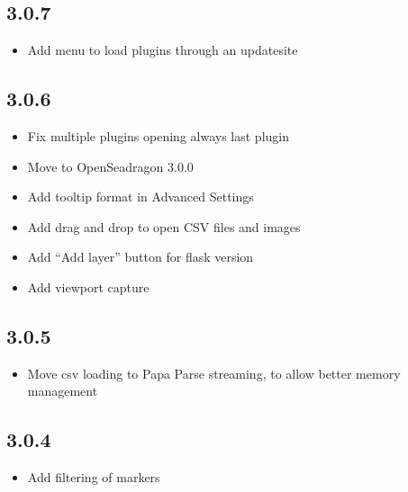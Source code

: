 \documentclass[letterpaper,10pt,english,openany,oneside]{sphinxmanual}
\begin{document}
\subsection{3.0.7}
\label{\detokenize{docs/intro/versions:id7}}\begin{itemize}
\item {} 
\sphinxAtStartPar
Add menu to load plugins through an update\sphinxhyphen{}site

\end{itemize}


\subsection{3.0.6}
\label{\detokenize{docs/intro/versions:id8}}\begin{itemize}
\item {} 
\sphinxAtStartPar
Fix multiple plugins opening always last plugin

\item {} 
\sphinxAtStartPar
Move to OpenSeadragon 3.0.0

\item {} 
\sphinxAtStartPar
Add tooltip format in Advanced Settings

\item {} 
\sphinxAtStartPar
Add drag and drop to open CSV files and images

\item {} 
\sphinxAtStartPar
Add “Add layer” button for flask version

\item {} 
\sphinxAtStartPar
Add viewport capture

\end{itemize}


\subsection{3.0.5}
\label{\detokenize{docs/intro/versions:id9}}\begin{itemize}
\item {} 
\sphinxAtStartPar
Move csv loading to Papa Parse streaming, to allow better memory management

\end{itemize}


\subsection{3.0.4}
\label{\detokenize{docs/intro/versions:id10}}\begin{itemize}
\item {} 
\sphinxAtStartPar
Add filtering of markers

\end{itemize}
\end{document}
